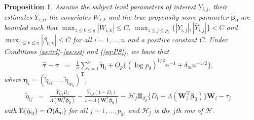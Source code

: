 \documentclass[12pt]{article}
\def\bea{\begin{eqnarray}}
\def\eea{\end{eqnarray}}
\def\T{{ \mathrm{\scriptscriptstyle T} }}
\newtheorem{proposition}{Proposition}
\theoremstyle{definition}
\newcommand{\E}{\rm E}
\newcommand{\V}{\rm Var}
\newcommand{\bW}{{\mathbf W}}
\newcommand{\bY}{{\mathbf Y}}
\newcommand{\bbeta}  {\boldsymbol{\beta}}
\newcommand{\bfeta}  {\boldsymbol{\eta}}
\newcommand{\bXi}{\boldsymbol{\Xi}}
\newcommand{\btau}{\boldsymbol{\tau}}
\begin{document}
\begin{proposition}\label{pn:1}
Assume the subject level parameters of interest $Y_{i,j}$, their estimates $\hat{Y}_{i, j}$, the covariates $W_{i,k}$ and the true propensity score parameter $\bbeta_0$ are bounded such that $\max_{1 \leq k \leq q} |W_{i,k}| \leq C$, $\max_{1 \leq j \leq p_0}\{|Y_{i,j}|, |\hat{Y}_{i, j}|\} < C$ and $\max_{1 \leq k \leq q} |\beta_{0,k}|\leq C$ for all $i = 1, \ldots, n$ and a positive constant $C$.
Under Conditions \ref{as:iid}--\ref{as:est} and (\ref{eq:PS}), 
we have that
\bea
\hat{\btau} - \btau &=& 
\frac{1}{n}\sum_{i = 1}^{n} \tilde{\bfeta}_{i} + O_{p}\{(\log p_0)^{1/2}n^{-1} + \delta_m n^{-1/2}\},
\label{eq:Expansion} 
\eea
where $\tilde{\bfeta}_i = (\tilde{\eta}_{i1}, \ldots, \tilde{\eta}_{i p_0})^{\T}$,
\bea
\tilde{\eta}_{ij} &=& 
\frac{\hat{Y}_{i,j}D_{i}}{\Lambda(\bW_{i}^{\T}\bbeta_{0})} - \frac{\hat{Y}_{i,j}(1 - D_{i})}{1 - \Lambda(\bW_{i}^{\T}\bbeta_{0})}
- \mathcal{H}_j \bXi_{\beta_{0}} \{D_{i} - \Lambda(\bW_{i}^{\T}\bbeta_{0})\} \bW_{i} - \tau_j \label{eq:Expansion1} 
\eea
with ${\E}(\tilde{\eta}_{ij}) = O(\delta_m)$ for all $j = 1, \ldots, p_0$, and $\mathcal{H}_{j}$ is the $j$th row of $\mathcal{H}$.
\end{proposition}
\end{document}
